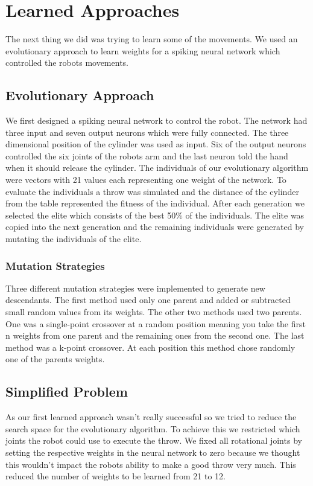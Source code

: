 \section{Learned Approaches}
The next thing we did was trying to learn some of the movements.
We used an evolutionary approach to learn weights for a spiking neural network which controlled the robots movements.

\subsection{Evolutionary Approach}
We first designed a spiking neural network to control the robot.
The network had three input and seven output neurons which were fully connected.
The three dimensional position of the cylinder was used as input.
Six of the output neurons controlled the six joints of the robots arm and the last neuron told the hand when it should release the cylinder.
The individuals of our evolutionary algorithm were vectors with 21 values each representing one weight of the network.
To evaluate the individuals a throw was simulated and the distance of the cylinder from the table represented the fitness of the individual.
After each generation we selected the elite which consists of the best 50\% of the individuals.
The elite was copied into the next generation and the remaining individuals were generated by mutating the individuals of the elite.

\subsubsection{Mutation Strategies}
Three different mutation strategies were implemented to generate new descendants.
The first method used only one parent and added or subtracted small random values from its weights.
The other two methods used two parents.
One was a single-point crossover at a random position meaning you take the first n weights from one parent and the remaining ones from the second one.
The last method was a k-point crossover.
At each position this method chose randomly one of the parents weights.

\subsection{Simplified Problem}
As our first learned approach wasn't really successful so we tried to reduce the search space for the evolutionary algorithm.
To achieve this we restricted which joints the robot could use to execute the throw.
We fixed all rotational joints by setting the respective weights in the neural network to zero because we thought this wouldn't impact the robots ability to make a good throw very much.
This reduced the number of weights to be learned from 21 to 12.